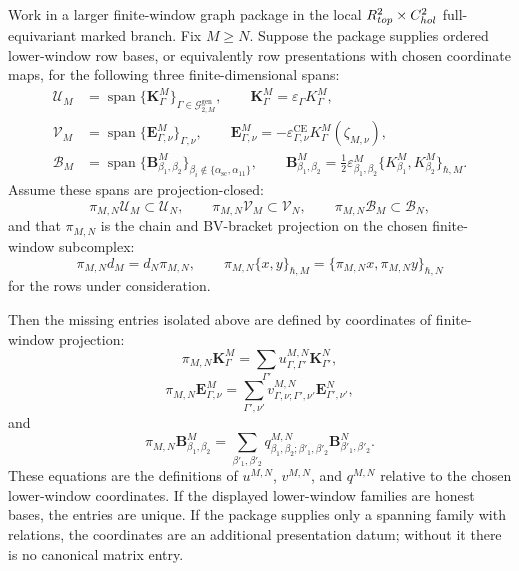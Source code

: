 \begin{prop}\label{prop:projection-defined-uvq-truncation-data}
  Work in a larger finite-window graph package in the local
  \(R^2_{top}\times C^2_{hol}\) full-equivariant marked
  branch.  Fix \(M\geq N\).  Suppose the package supplies ordered
  lower-window row bases, or equivalently row presentations with chosen
  coordinate maps, for the following three finite-dimensional spans:
  \[
  \begin{aligned}
    \mathcal U_M
      &=
      \operatorname{span}\{\mathbf K^M_\Gamma\}_{\Gamma\in
      \mathcal G^{\mathrm{gen}}_{2,M}},
      \qquad
      \mathbf K^M_\Gamma=\varepsilon_\Gamma K^M_\Gamma,\\
    \mathcal V_M
      &=
      \operatorname{span}\{\mathbf E^M_{\Gamma,\nu}\}_{\Gamma,\nu},
      \qquad
      \mathbf E^M_{\Gamma,\nu}
        =
      -\varepsilon^{\mathrm{CE}}_{\Gamma,\nu}
      K^M_\Gamma(\zeta_{M,\nu}),\\
    \mathcal B_M
      &=
      \operatorname{span}\{\mathbf B^M_{\beta_1,\beta_2}\}_{\beta_i\notin
      \{\alpha_{\mathrm{sc}},\alpha_{11}\}},
      \qquad
      \mathbf B^M_{\beta_1,\beta_2}
        =
      \frac12\varepsilon^M_{\beta_1,\beta_2}
      \{K^M_{\beta_1},K^M_{\beta_2}\}_{\hbar,M}.
  \end{aligned}
  \]
  Assume these spans are projection-closed:
  \[
    \pi_{M,N}\mathcal U_M\subset\mathcal U_N,\qquad
    \pi_{M,N}\mathcal V_M\subset\mathcal V_N,\qquad
    \pi_{M,N}\mathcal B_M\subset\mathcal B_N,
  \]
  and that \(\pi_{M,N}\) is the chain and BV-bracket projection on the
  chosen finite-window subcomplex:
  \[
    \pi_{M,N}d_M=d_N\pi_{M,N},
    \qquad
    \pi_{M,N}\{x,y\}_{\hbar,M}
      =
    \{\pi_{M,N}x,\pi_{M,N}y\}_{\hbar,N}
  \]
  for the rows under consideration.

  Then the missing entries isolated above are defined by coordinates of
  finite-window projection:
  \[
    \pi_{M,N}\mathbf K^M_\Gamma
      =
    \sum_{\Gamma'}
      u^{M,N}_{\Gamma,\Gamma'}\mathbf K^N_{\Gamma'},
  \]
  \[
    \pi_{M,N}\mathbf E^M_{\Gamma,\nu}
      =
    \sum_{\Gamma',\nu'}
      v^{M,N}_{\Gamma,\nu;\Gamma',\nu'}
      \mathbf E^N_{\Gamma',\nu'},
  \]
  and
  \[
    \pi_{M,N}\mathbf B^M_{\beta_1,\beta_2}
      =
    \sum_{\beta'_1,\beta'_2}
      q^{M,N}_{\beta_1,\beta_2;\beta'_1,\beta'_2}
      \mathbf B^N_{\beta'_1,\beta'_2}.
  \]
  These equations are the definitions of \(u^{M,N}\), \(v^{M,N}\), and
  \(q^{M,N}\) relative to the chosen lower-window coordinates.  If the
  displayed lower-window families are honest bases, the entries are unique.
  If the package supplies only a spanning family with relations, the
  coordinates are an additional presentation datum; without it there is no
  canonical matrix entry.


\end{prop}
